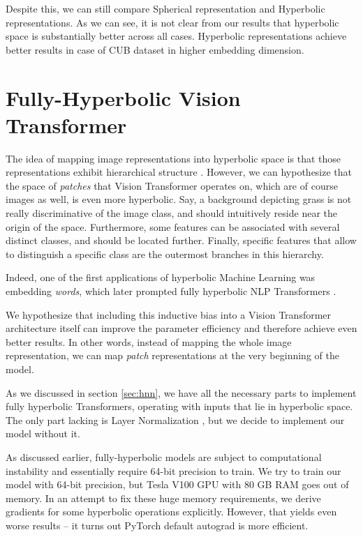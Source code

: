 \documentclass[10pt, letterpaper, twocolumn]{article}
\begin{document}
Despite this, we can still compare Spherical representation and Hyperbolic representations. As we can see, it is not clear from our results that hyperbolic space is substantially better across all cases. Hyperbolic representations achieve better results in case of CUB dataset in higher embedding dimension.

\section{Fully-Hyperbolic Vision Transformer}\label{sec:fully}


The idea of mapping image representations into hyperbolic space is that those representations exhibit hierarchical structure \cite{khrulkov_hyperbolic_2020}. However, we can hypothesize that the space of \emph{patches} that Vision Transformer operates on, which are of course images as well, is even more hyperbolic. Say, a background depicting grass is not really discriminative of the image class, and should intuitively reside near the origin of the space. Furthermore, some features can be associated with several distinct classes, and should be located further. Finally, specific features that allow to distinguish a specific class are the outermost branches in this hierarchy.

Indeed, one of the first applications of hyperbolic Machine Learning was embedding \emph{words}, which later prompted fully hyperbolic NLP Transformers \cite{ganea_hyperbolic_2018, nickel_learning_2018}.

We hypothesize that including this inductive bias into a Vision Transformer architecture itself can improve the parameter efficiency and therefore achieve even better results. In other words, instead of mapping the whole image representation, we can map \emph{patch} representations at the very beginning of the model.

As we discussed in section \ref{sec:hnn}, we have all the necessary parts to implement fully hyperbolic Transformers, operating with inputs that lie in hyperbolic space. The only part lacking is Layer Normalization \cite{ba_layer_2016}, but we decide to implement our model without it.

As discussed earlier, fully-hyperbolic models are subject to computational instability and essentially require 64-bit precision to train. We try to train our model with 64-bit precision, but Tesla V100 GPU with 80 GB RAM goes out of memory. In an attempt to fix these huge memory requirements, we derive gradients for some hyperbolic operations explicitly.
However, that yields even worse results -- it turns out PyTorch default autograd is more efficient.
\end{document}
